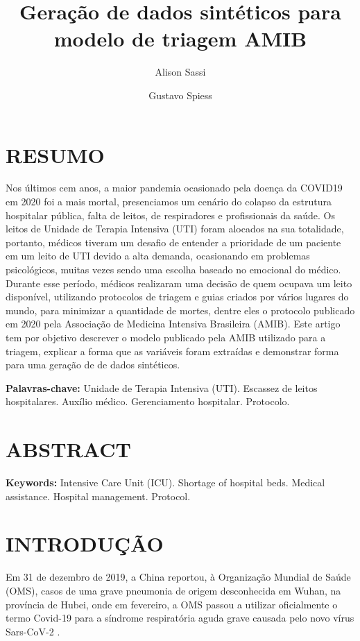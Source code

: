 \documentclass[12pt]{article}
\title{Geração de dados sintéticos para modelo de triagem AMIB }
\author{Alison Sassi\inst{1} \and Gustavo Spiess\inst{2} }
\begin{document}
\maketitle

\section{RESUMO}

Nos últimos cem anos, a maior pandemia ocasionado pela doença da COVID19 em 2020 foi a mais mortal, presenciamos um cenário do colapso da estrutura hospitalar pública, falta de leitos, de respiradores e profissionais da saúde. Os leitos de Unidade de Terapia Intensiva (UTI) foram alocados na sua totalidade, portanto, médicos tiveram um desafio de entender a prioridade de um paciente em um leito de UTI devido a alta demanda, ocasionando em problemas psicológicos, muitas vezes sendo uma escolha baseado no emocional do médico. Durante esse período, médicos realizaram uma decisão de quem ocupava um leito disponível, utilizando protocolos de triagem e guias criados por vários lugares do mundo, para minimizar a quantidade de mortes, dentre eles o protocolo publicado em 2020 pela Associação de Medicina Intensiva Brasileira (AMIB). Este artigo tem por objetivo descrever o modelo publicado pela AMIB utilizado para a triagem, explicar a forma que as variáveis foram extraídas e demonstrar forma para uma geração de de dados sintéticos.

\textbf{Palavras-chave:} Unidade de Terapia Intensiva (UTI). Escassez de leitos hospitalares. Auxílio médico. Gerenciamento hospitalar. Protocolo.

\section{ABSTRACT} 
\textbf{Keywords:} Intensive Care Unit (ICU). Shortage of hospital beds. Medical assistance. Hospital management. Protocol.

\section{INTRODUÇÃO}
Em 31 de dezembro de 2019, a China reportou, à Organização Mundial de Saúde (OMS), casos de uma grave pneumonia de origem desconhecida em Wuhan, na província de Hubei, onde em fevereiro, a OMS passou a utilizar oficialmente o termo Covid-19 para a síndrome respiratória aguda grave causada pelo novo vírus Sars-CoV-2 \cite{sa2020especial}.
\end{document}
